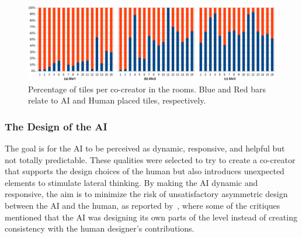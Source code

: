 \begin{figure}[]
 \includegraphics[width=\textwidth]{images/combined-bars.png}
 \caption{Percentage of tiles per co-creator in the rooms. Blue and Red bars relate to AI and Human placed tiles, respectively.}
 \label{fig:human-ai-contribution}
\end{figure}


\subsubsection{The Design of the AI}





The goal is for the AI to be perceived as dynamic, responsive, and helpful but not totally predictable. These qualities were selected to try to create a co-creator that supports the design choices of the human but also introduces unexpected elements to stimulate lateral thinking. By making the AI dynamic and responsive, the aim is to minimize the risk of unsatisfactory asymmetric design between the AI and the human, as reported by~, where some of the critiques mentioned that the AI was designing its own parts of the level instead of creating consistency with the human designer's contributions.


